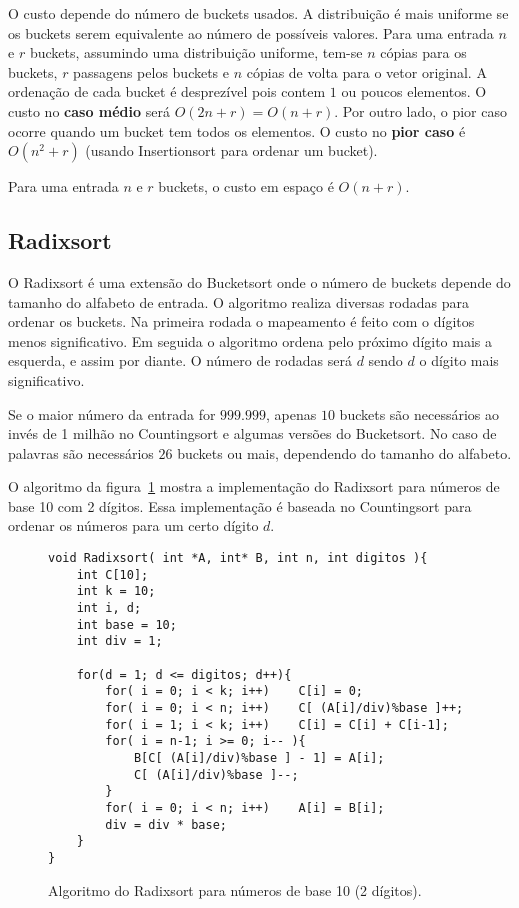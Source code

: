 O custo depende do número de buckets usados. 
A distribuição é mais uniforme se os buckets serem equivalente ao número de possíveis valores.
Para uma entrada $n$ e $r$ buckets, assumindo uma distribuição uniforme, tem-se
$n$ cópias para os buckets, $r$ passagens pelos buckets e $n$ cópias de volta
para o vetor original.
A ordenação de cada bucket é desprezível pois contem $1$ ou poucos elementos.
O custo no {\bf caso médio} será $O(2n+r) = O(n+r)$. 
Por outro lado, o pior caso ocorre quando um bucket tem todos os elementos.
O custo no {\bf pior caso}  é $O(n^2+r)$ (usando Insertionsort para ordenar um bucket).

Para uma entrada $n$ e $r$ buckets, o custo em espaço é $O(n+r)$.

\subsection{Radixsort}

O Radixsort é uma extensão do Bucketsort onde o número de buckets depende do
tamanho  do alfabeto de entrada.
O algoritmo realiza diversas rodadas para ordenar os buckets. 
Na primeira rodada o mapeamento é feito com o dígitos menos significativo.
Em seguida o algoritmo ordena pelo próximo dígito mais a esquerda, e assim por diante.
O número de rodadas será $d$ sendo $d$ o dígito mais significativo.

Se o maior número da entrada for $999.999$, apenas $10$ buckets são necessários
ao invés de 1 milhão no Countingsort e algumas versões do Bucketsort.
No caso de palavras são necessários $26$ buckets ou mais, dependendo do tamanho
do alfabeto.

O algoritmo da figura~\ref{aula03:algo:radix} mostra a implementação do Radixsort
para números de base 10 com 2 dígitos.
Essa implementação é baseada no Countingsort para ordenar os números para um certo
dígito $d$.
%
\begin{figure}[!htb]
\centering
\begin{framed}
\begin{lstlisting}
void Radixsort( int *A, int* B, int n, int digitos ){
	int C[10];
	int k = 10;
	int i, d;
	int base = 10;
	int div = 1;

	for(d = 1; d <= digitos; d++){
		for( i = 0; i < k; i++)    C[i] = 0;
		for( i = 0; i < n; i++)    C[ (A[i]/div)%base ]++;
		for( i = 1; i < k; i++)    C[i] = C[i] + C[i-1];
		for( i = n-1; i >= 0; i-- ){
			B[C[ (A[i]/div)%base ] - 1] = A[i];
			C[ (A[i]/div)%base ]--;
		}
		for( i = 0; i < n; i++)    A[i] = B[i];
		div = div * base;
	}
}
\end{lstlisting}
\end{framed}
\caption{Algoritmo do Radixsort para números de base 10 (2 dígitos).}
\label{aula03:algo:radix}
\end{figure}

